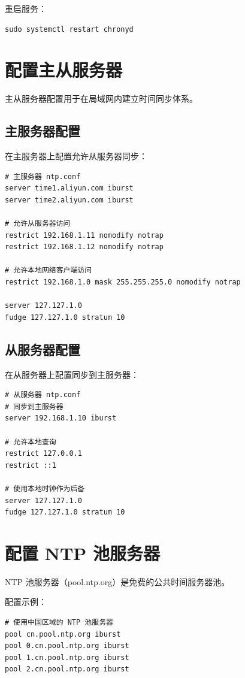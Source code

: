 \documentclass[12pt,UTF8]{ctexbook}
\begin{document}
重启服务：
\begin{verbatim}
sudo systemctl restart chronyd
\end{verbatim}

\section{配置主从服务器}
\label{sec:configure_master_slave}

主从服务器配置用于在局域网内建立时间同步体系。

\subsection{主服务器配置}

在主服务器上配置允许从服务器同步：
\begin{verbatim}
# 主服务器 ntp.conf
server time1.aliyun.com iburst
server time2.aliyun.com iburst

# 允许从服务器访问
restrict 192.168.1.11 nomodify notrap
restrict 192.168.1.12 nomodify notrap

# 允许本地网络客户端访问
restrict 192.168.1.0 mask 255.255.255.0 nomodify notrap

server 127.127.1.0
fudge 127.127.1.0 stratum 10
\end{verbatim}

\subsection{从服务器配置}

在从服务器上配置同步到主服务器：
\begin{verbatim}
# 从服务器 ntp.conf
# 同步到主服务器
server 192.168.1.10 iburst

# 允许本地查询
restrict 127.0.0.1
restrict ::1

# 使用本地时钟作为后备
server 127.127.1.0
fudge 127.127.1.0 stratum 10
\end{verbatim}

\section{配置 NTP 池服务器}
\label{sec:configure_pool_server}

NTP 池服务器（pool.ntp.org）是免费的公共时间服务器池。

配置示例：
\begin{verbatim}
# 使用中国区域的 NTP 池服务器
pool cn.pool.ntp.org iburst
pool 0.cn.pool.ntp.org iburst
pool 1.cn.pool.ntp.org iburst
pool 2.cn.pool.ntp.org iburst
\end{verbatim}
\end{document}
